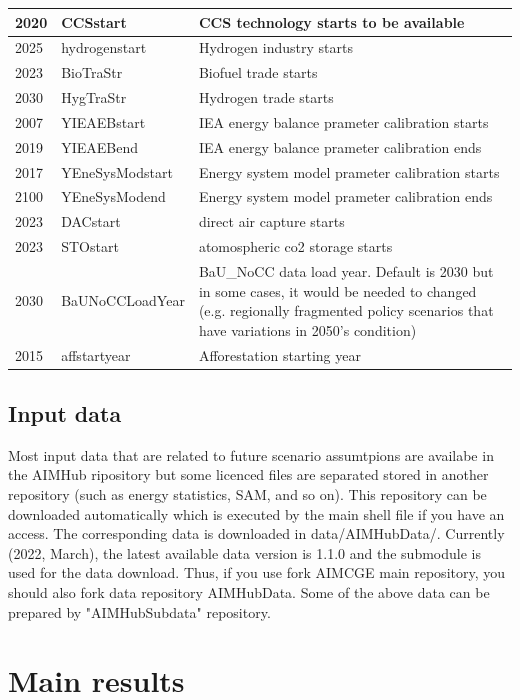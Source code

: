\documentclass[10pt,a4paper,titlepage,dvipdfmx]{book}
\begin{document}
\begin{tabularx}{\textwidth}{|
p{}|
p{}|
p{}|}
2020 & CCSstart & CCS technology starts to be available \\\hline 
2025 & hydrogenstart & Hydrogen industry starts \\\hline 
2023 & BioTraStr & Biofuel trade starts \\\hline 
2030 & HygTraStr & Hydrogen trade starts \\\hline 
2007 & YIEAEBstart & IEA energy balance prameter calibration starts \\\hline 
2019 & YIEAEBend & IEA energy balance prameter calibration ends \\\hline 
2017 & YEneSysModstart & Energy system model prameter calibration starts \\\hline 
2100 & YEneSysModend & Energy system model prameter calibration ends \\\hline 
2023 & DACstart & direct air capture starts \\\hline 
2023 & STOstart & atomospheric co2 storage starts \\\hline 
2030 & BaUNoCCLoadYear & BaU\_NoCC data load year. Default is 2030 but in some cases, it would be needed to changed (e.g. regionally fragmented policy scenarios that have variations in 2050's condition) \\\hline 
2015 & affstartyear & Afforestation starting year \\\hline 
\end{tabularx}

\section{\label{sec:InpData}Input data}
Most input data that are related to future scenario assumtpions are availabe in the AIMHub ripository but some licenced files are separated stored in another repository (such as energy statistics, SAM, and so on).
This repository can be downloaded automatically which is executed by the main shell file if you have an access.
The corresponding data is downloaded in data/AIMHubData/. Currently (2022, March), the latest available data version is 1.1.0 and the submodule is used for the data download. Thus, if you use fork AIMCGE main repository, you should also fork data repository AIMHubData.
Some of the above data can be prepared by "AIMHubSubdata" repository.


\chapter{\label{chp:MainRes}Main results}
\end{document}
